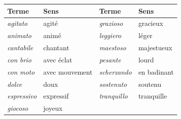 \begin{tabular}{@{}l l l l@{}}
\toprule
\textbf{Terme} & \textbf{Sens} & \textbf{Terme} & \textbf{Sens} \\
\midrule
\emph{agitato} & agité & \emph{grazioso} & gracieux \\
\emph{animato} & animé & \emph{leggiero} & léger \\
\emph{cantabile} & chantant & \emph{maestoso} & majestueux \\
\emph{con brio} & avec éclat & \emph{pesante} & lourd \\
\emph{con moto} & avec mouvement & \emph{scherzando} & en badinant \\
\emph{dolce} & doux & \emph{sostenuto} & soutenu \\
\emph{espressivo} & expressif & \emph{tranquillo} & tranquille \\
\emph{giocoso} & joyeux &  &  \\
\bottomrule
\end{tabular}
